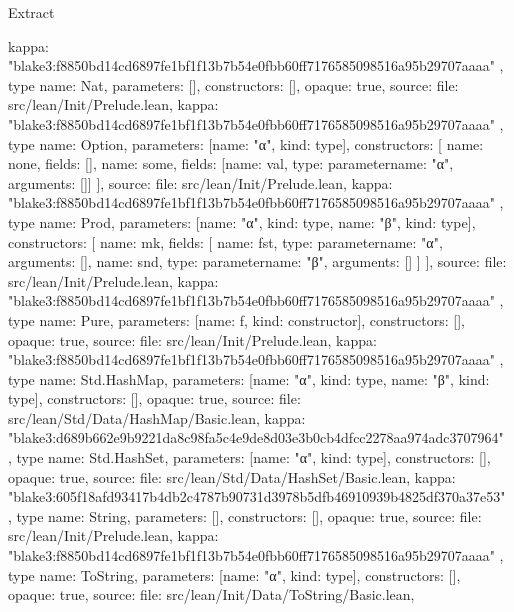 \begin{lexlean}{Extract}
\begin{toolingmodule}
{{{        kappa: "blake3:f8850bd14cd6897fe1bf1f13b7b54e0fbb60ff7176585098516a95b29707aaaa"
      }
    },
    type{
      name: Nat,
      parameters: [],
      constructors: [],
      opaque: true,
      source: {
        file: src/lean/Init/Prelude.lean,
        kappa: "blake3:f8850bd14cd6897fe1bf1f13b7b54e0fbb60ff7176585098516a95b29707aaaa"
      }
    },
    type{
      name: Option,
      parameters: [{name: "α", kind: type{}}],
      constructors: [
        {name: none, fields: []},
        {name: some, fields: [{name: val, type: parameter{name: "α", arguments: []}}]}
      ],
      source: {
        file: src/lean/Init/Prelude.lean,
        kappa: "blake3:f8850bd14cd6897fe1bf1f13b7b54e0fbb60ff7176585098516a95b29707aaaa"
      }
    },
    type{
      name: Prod,
      parameters: [{name: "α", kind: type{}}, {name: "β", kind: type{}}],
      constructors: [
        {
          name: mk,
          fields: [
            {name: fst, type: parameter{name: "α", arguments: []}},
            {name: snd, type: parameter{name: "β", arguments: []}}
          ]
        }
      ],
      source: {
        file: src/lean/Init/Prelude.lean,
        kappa: "blake3:f8850bd14cd6897fe1bf1f13b7b54e0fbb60ff7176585098516a95b29707aaaa"
      }
    },
    type{
      name: Pure,
      parameters: [{name: f, kind: constructor{}}],
      constructors: [],
      opaque: true,
      source: {
        file: src/lean/Init/Prelude.lean,
        kappa: "blake3:f8850bd14cd6897fe1bf1f13b7b54e0fbb60ff7176585098516a95b29707aaaa"
      }
    },
    type{
      name: Std.HashMap,
      parameters: [{name: "α", kind: type{}}, {name: "β", kind: type{}}],
      constructors: [],
      opaque: true,
      source: {
        file: src/lean/Std/Data/HashMap/Basic.lean,
        kappa: "blake3:d689b662e9b9221da8c98fa5c4e9de8d03e3b0cb4dfcc2278aa974adc3707964"
      }
    },
    type{
      name: Std.HashSet,
      parameters: [{name: "α", kind: type{}}],
      constructors: [],
      opaque: true,
      source: {
        file: src/lean/Std/Data/HashSet/Basic.lean,
        kappa: "blake3:605f18afd93417b4db2c4787b90731d3978b5dfb46910939b4825df370a37e53"
      }
    },
    type{
      name: String,
      parameters: [],
      constructors: [],
      opaque: true,
      source: {
        file: src/lean/Init/Prelude.lean,
        kappa: "blake3:f8850bd14cd6897fe1bf1f13b7b54e0fbb60ff7176585098516a95b29707aaaa"
      }
    },
    type{
      name: ToString,
      parameters: [{name: "α", kind: type{}}],
      constructors: [],
      opaque: true,
      source: {
        file: src/lean/Init/Data/ToString/Basic.lean,
}}}
\end{toolingmodule}
\end{lexlean}
